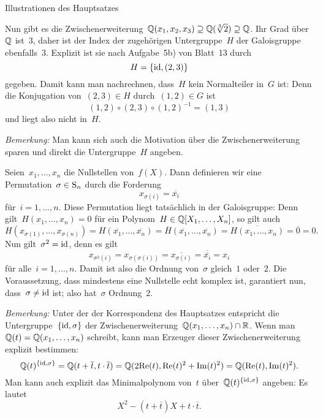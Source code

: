 \documentclass{algblatt}
\begin{document}
\begin{aufgabe}{Illustrationen des Hauptsatzes}
\begin{loesungE}
Nun gibt es die Zwischenerweiterung~$\mathbb{Q}(x_1,x_2,x_3) \supseteq
\mathbb{Q}(\sqrt[3]{2}) \supseteq \mathbb{Q}$. Ihr Grad über~$\mathbb{Q}$ ist~$3$, daher ist der
Index der zugehörigen Untergruppe~$H$ der Galoisgruppe ebenfalls~$3$. Explizit ist
sie nach Aufgabe~5b) von Blatt~13 durch
\[ H = \{ \mathrm{id}, (2, 3) \} \]
gegeben. Damit kann man nachrechnen, dass~$H$ kein Normalteiler
in~$G$ ist: Denn die Konjugation von~$(2,3) \in H$
durch~$(1,2) \in G$ ist
\[ (1,2) \circ (2,3) \circ (1,2)^{-1} =
  (1,3) \]
und liegt also nicht in~$H$.

\emph{Bemerkung:} Man kann sich auch die Motivation über die
Zwischenerweiterung sparen und direkt die Untergruppe~$H$ angeben.

\item Seien~$x_1,\ldots,x_n$ die Nullstellen von~$f(X)$. Dann definieren wir
eine Permutation~$\sigma \in \mathrm{S}_n$ durch die Forderung
\[ x_{\sigma(i)} = \overline{x_i} \]
für~$i = 1,\ldots,n$.
Diese Permutation liegt tatsächlich in der Galoisgruppe: Denn
gilt~$H(x_1,\ldots,x_n) = 0$ für ein Polynom~$H \in \mathbb{Q}[X_1,\ldots,X_n]$, so
gilt auch
\[ H(x_{\sigma(1)},\ldots,x_{\sigma(n)}) =
  H(\overline{x_1},\ldots,\overline{x_n}) =
  \overline{H}(\overline{x_1},\ldots,\overline{x_n}) =
  \overline{H(x_1,\ldots,x_n)} =
  \overline{0} = 0. \]
Nun gilt~$\sigma^2 = \mathrm{id}$, denn es gilt
\[ x_{\sigma^2(i)} = x_{\sigma(\sigma(i))} = \overline{x_{\sigma(i)}} =
\overline{\overline{x_i}} = x_i \]
für alle~$i = 1,\ldots,n$. Damit ist also die Ordnung von~$\sigma$ gleich~$1$
oder~$2$. Die Voraussetzung, dass mindestens eine Nullstelle echt komplex ist,
garantiert nun, dass~$\sigma \neq \mathrm{id}$ ist; also hat~$\sigma$ Ordnung~$2$.

\emph{Bemerkung:} Unter der der Korrespondenz des Hauptsatzes entspricht die
Untergruppe~$\{\mathrm{id},\sigma\}$ der Zwischenerweiterung~$\mathbb{Q}(x_1,\ldots,x_n) \cap
\mathbb{R}$. Wenn man~$\mathbb{Q}(t) = \mathbb{Q}(x_1,\ldots,x_n)$ schreibt, kann man Erzeuger
dieser Zwischenerweiterung explizit bestimmen:
\[ \mathbb{Q}(t)^{\{\mathrm{id},\sigma\}} = \mathbb{Q}(t + \overline{t}, t \cdot \overline{t}) =
  \mathbb{Q}(2 \mathrm{Re}(t), \mathrm{Re}(t)^2 + \mathrm{Im}(t)^2) =
  \mathbb{Q}(\mathrm{Re}(t), \mathrm{Im}(t)^2). \]
Man kann auch explizit das Minimalpolynom von~$t$
über~$\mathbb{Q}(t)^{\{\mathrm{id},\sigma\}}$ angeben: Es lautet
\[ X^2 - (t + \overline{t}) X + t \cdot \overline{t}. \]


\end{loesungE}
\end{aufgabe}
\end{document}
